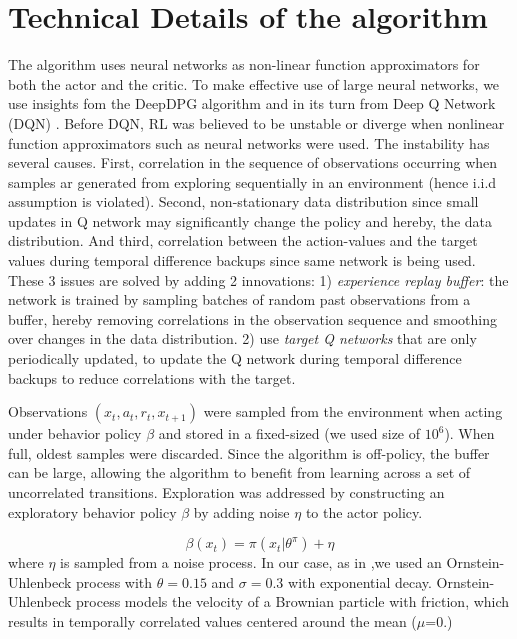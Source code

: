 \section{Technical Details of the algorithm} \label{sec:technical_details}
The algorithm uses neural networks as non-linear function approximators for both the actor and the critic.
To make effective use of large neural networks, we use insights fom the DeepDPG algorithm \cite{Lillicrap2016} and in its turn
from Deep Q Network (DQN) \citep{Mnih2015}.
Before DQN, RL was believed to be unstable or diverge when nonlinear function approximators such as neural networks were used.
The instability has several causes. First, correlation in the sequence of observations occurring when
samples ar generated from exploring sequentially in an environment (hence i.i.d assumption is violated).
Second, non-stationary data distribution since small updates in Q network may significantly change the policy and hereby, the data distribution.
And third, correlation between the action-values and the target values during temporal difference backups since same network is being used.
These 3 issues are solved by adding 2 innovations: 1)  \textit{experience replay buffer}: the network is trained by sampling 
batches of random past observations from a buffer, hereby removing correlations in the observation sequence and smoothing over
changes in the data distribution.
2) use \textit{target Q networks} that are only periodically updated, to update the Q network during temporal difference backups to reduce
correlations with the target.

Observations $(x_t,a_t,r_t,x_{t+1})$ were sampled from the environment when acting under behavior policy $\beta$ and stored
in a fixed-sized (we used size of $10^6$). When full, oldest samples were discarded.
Since the algorithm is off-policy, the buffer can be large, allowing the algorithm to benefit from
learning across a set of uncorrelated transitions.
Exploration was addressed by constructing an exploratory behavior policy $\beta$ by adding noise $\eta$ to the actor policy.

\begin{equation}
    \beta(x_t)=\pi(x_t| \theta^\pi) + \eta
\end{equation}
where $\eta$ is sampled from a noise process. In our case, as in \citet{Lillicrap2016},we
used an Ornstein-Uhlenbeck process \citep{Uhlenbeck1930} with $\theta = 0.15$ and $\sigma=0.3$ with exponential decay.
Ornstein-Uhlenbeck process models the velocity of a Brownian particle with friction, which results in temporally correlated
values centered around the mean ($\mu$=0.) 

